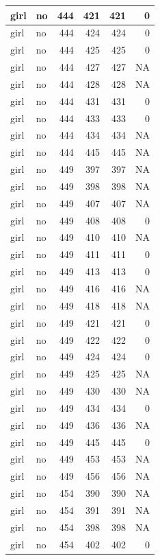 \documentclass[man]{apa6}
\begin{document}
\begin{tabular}{l|l|r|r|r|r}
\hline
girl & no & 444 & 421 & 421 & 0\\
\hline
girl & no & 444 & 424 & 424 & 0\\
\hline
girl & no & 444 & 425 & 425 & 0\\
\hline
girl & no & 444 & 427 & 427 & NA\\
\hline
girl & no & 444 & 428 & 428 & NA\\
\hline
girl & no & 444 & 431 & 431 & 0\\
\hline
girl & no & 444 & 433 & 433 & 0\\
\hline
girl & no & 444 & 434 & 434 & NA\\
\hline
girl & no & 444 & 445 & 445 & NA\\
\hline
girl & no & 449 & 397 & 397 & NA\\
\hline
girl & no & 449 & 398 & 398 & NA\\
\hline
girl & no & 449 & 407 & 407 & NA\\
\hline
girl & no & 449 & 408 & 408 & 0\\
\hline
girl & no & 449 & 410 & 410 & NA\\
\hline
girl & no & 449 & 411 & 411 & 0\\
\hline
girl & no & 449 & 413 & 413 & 0\\
\hline
girl & no & 449 & 416 & 416 & NA\\
\hline
girl & no & 449 & 418 & 418 & NA\\
\hline
girl & no & 449 & 421 & 421 & 0\\
\hline
girl & no & 449 & 422 & 422 & 0\\
\hline
girl & no & 449 & 424 & 424 & 0\\
\hline
girl & no & 449 & 425 & 425 & NA\\
\hline
girl & no & 449 & 430 & 430 & NA\\
\hline
girl & no & 449 & 434 & 434 & 0\\
\hline
girl & no & 449 & 436 & 436 & NA\\
\hline
girl & no & 449 & 445 & 445 & 0\\
\hline
girl & no & 449 & 453 & 453 & NA\\
\hline
girl & no & 449 & 456 & 456 & NA\\
\hline
girl & no & 454 & 390 & 390 & NA\\
\hline
girl & no & 454 & 391 & 391 & NA\\
\hline
girl & no & 454 & 398 & 398 & NA\\
\hline
girl & no & 454 & 402 & 402 & 0\\

\end{tabular}
\end{document}
